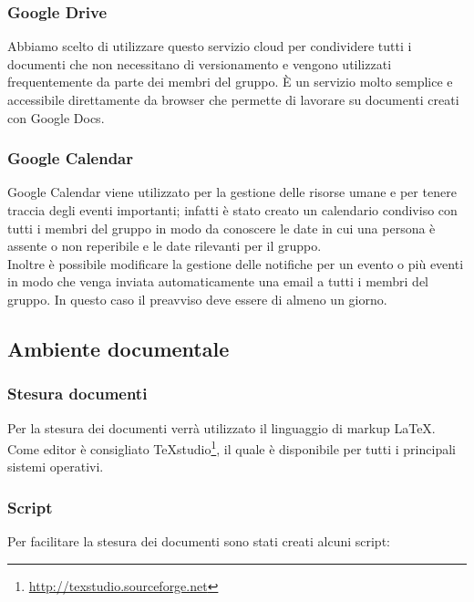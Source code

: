\subsubsection{Google Drive}

Abbiamo scelto di utilizzare questo servizio cloud per condividere tutti i documenti che non necessitano di versionamento e vengono utilizzati frequentemente da parte dei membri del gruppo. 
È un servizio molto semplice e accessibile direttamente da browser che permette di lavorare su documenti creati con Google Docs.

\subsubsection{Google Calendar}
Google Calendar viene utilizzato per la gestione delle risorse umane e per tenere traccia degli eventi importanti; infatti è stato creato un calendario condiviso con tutti i membri del gruppo in modo da conoscere le date in cui una persona è assente o non reperibile e le date rilevanti per il gruppo.\\
Inoltre è possibile modificare la gestione delle notifiche per un evento o più eventi in modo che venga inviata automaticamente una email a tutti i membri del gruppo. In questo caso il preavviso deve essere di almeno un giorno.

\subsection{Ambiente documentale}

\subsubsection{Stesura documenti}

Per la stesura dei documenti verrà utilizzato il linguaggio di markup \LaTeX.
Come editor è consigliato TeXstudio\footnote{\url{http://texstudio.sourceforge.net}}, il quale è disponibile per tutti i principali sistemi operativi.

\subsubsection{Script}

Per facilitare la stesura dei documenti sono stati creati alcuni script:

